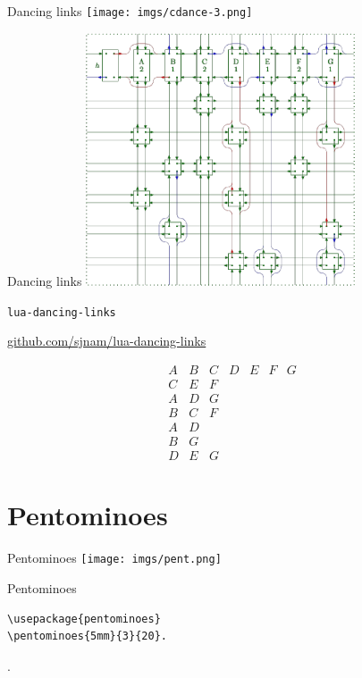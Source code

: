 \documentclass[xcolor=svgnames]{beamer}
\begin{document}
%
\begin{frame}{Dancing links}
  \centering\texttt{[image: imgs/cdance-3.png]}
\end{frame}

%
\begin{frame}{Dancing links}
  \centering\includegraphics[height=7.5cm]{imgs/cdance-4.png}
\end{frame}

%
\begin{frame}{\texttt{lua-dancing-links}}
\begin{center}
  \href{https://github.com/sjnam/lua-dancing-links}
       {github.com/sjnam/lua-dancing-links}
\end{center}
\boldmath
{
\large
$$
  \begin{array}{ccccccc}
    A & B & C & D & E & F & G\\
    C & E &F &&&&\\
    A & D & G &&&&\\
    B & C & F &&&&\\
    A & D &&&&&\\
    B & G &&&&&\\
    D & E & G &&&&
  \end{array}
$$
}
\end{frame}


\section{Pentominoes}

%
\begin{frame}[fragile]{Pentominoes}
  \centering\texttt{[image: imgs/pent.png]}
\end{frame}

%
\begin{frame}[fragile]{Pentominoes}
\begin{verbatim}
\usepackage{pentominoes}
\pentominoes{5mm}{3}{20}.
\end{verbatim}
.
\end{frame}
\end{document}
